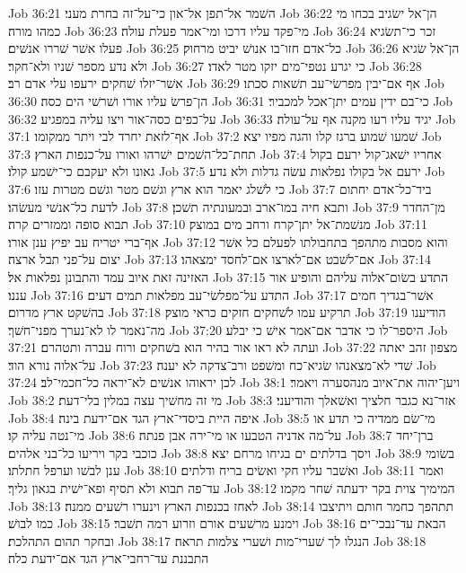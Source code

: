 Job 36:21  השׁמר אל־תפן אל־און כי־על־זה בחרת מעני׃
Job 36:22  הן־אל ישׂגיב בכחו מי כמהו מורה׃
Job 36:23  מי־פקד עליו דרכו ומי־אמר פעלת עולה׃
Job 36:24  זכר כי־תשׂגיא פעלו אשׁר שׁררו אנשׁים׃
Job 36:25  כל־אדם חזו־בו אנושׁ יביט מרחוק׃
Job 36:26  הן־אל שׂגיא ולא נדע מספר שׁניו ולא־חקר׃
Job 36:27  כי יגרע נטפי־מים יזקו מטר לאדו׃
Job 36:28  אשׁר־יזלו שׁחקים ירעפו עלי אדם רב׃
Job 36:29  אף אם־יבין מפרשׂי־עב תשׁאות סכתו׃
Job 36:30  הן־פרשׂ עליו אורו ושׁרשׁי הים כסה׃
Job 36:31  כי־בם ידין עמים יתן־אכל למכביר׃
Job 36:32  על־כפים כסה־אור ויצו עליה במפגיע׃
Job 36:33  יגיד עליו רעו מקנה אף על־עולה׃
Job 37:1  אף־לזאת יחרד לבי ויתר ממקומו׃
Job 37:2  שׁמעו שׁמוע ברגז קלו והגה מפיו יצא׃
Job 37:3  תחת־כל־השׁמים ישׁרהו ואורו על־כנפות הארץ׃
Job 37:4  אחריו ישׁאג־קול ירעם בקול גאונו ולא יעקבם כי־ישׁמע קולו׃
Job 37:5  ירעם אל בקולו נפלאות עשׂה גדלות ולא נדע׃
Job 37:6  כי לשׁלג יאמר הוא ארץ וגשׁם מטר וגשׁם מטרות עזו׃
Job 37:7  ביד־כל־אדם יחתום לדעת כל־אנשׁי מעשׂהו׃
Job 37:8  ותבא חיה במו־ארב ובמעונתיה תשׁכן׃
Job 37:9  מן־החדר תבוא סופה וממזרים קרה׃
Job 37:10  מנשׁמת־אל יתן־קרח ורחב מים במוצק׃
Job 37:11  אף־ברי יטריח עב יפיץ ענן אורו׃
Job 37:12  והוא מסבות מתהפך בתחבולתו לפעלם כל אשׁר יצום על־פני תבל ארצה׃
Job 37:13  אם־לשׁבט אם־לארצו אם־לחסד ימצאהו׃
Job 37:14  האזינה זאת איוב עמד והתבונן נפלאות אל׃
Job 37:15  התדע בשׂום־אלוה עליהם והופיע אור עננו׃
Job 37:16  התדע על־מפלשׂי־עב מפלאות תמים דעים׃
Job 37:17  אשׁר־בגדיך חמים בהשׁקט ארץ מדרום׃
Job 37:18  תרקיע עמו לשׁחקים חזקים כראי מוצק׃
Job 37:19  הודיענו מה־נאמר לו לא־נערך מפני־חשׁך׃
Job 37:20  היספר־לו כי אדבר אם־אמר אישׁ כי יבלע׃
Job 37:21  ועתה לא ראו אור בהיר הוא בשׁחקים ורוח עברה ותטהרם׃
Job 37:22  מצפון זהב יאתה על־אלוה נורא הוד׃
Job 37:23  שׁדי לא־מצאנהו שׂגיא־כח ומשׁפט ורב־צדקה לא יענה׃
Job 37:24  לכן יראוהו אנשׁים לא־יראה כל־חכמי־לב׃
Job 38:1  ויען־יהוה את־איוב מנהסערה ויאמר׃
Job 38:2  מי זה מחשׁיך עצה במלין בלי־דעת׃
Job 38:3  אזר־נא כגבר חלציך ואשׁאלך והודיעני׃
Job 38:4  איפה היית ביסדי־ארץ הגד אם־ידעת בינה׃
Job 38:5  מי־שׂם ממדיה כי תדע או מי־נטה עליה קו׃
Job 38:6  על־מה אדניה הטבעו או מי־ירה אבן פנתה׃
Job 38:7  ברן־יחד כוכבי בקר ויריעו כל־בני אלהים׃
Job 38:8  ויסך בדלתים ים בגיחו מרחם יצא׃
Job 38:9  בשׂומי ענן לבשׁו וערפל חתלתו׃
Job 38:10  ואשׁבר עליו חקי ואשׂים בריח ודלתים׃
Job 38:11  ואמר עד־פה תבוא ולא תסיף ופא־ישׁית בגאון גליך׃
Job 38:12  המימיך צוית בקר ידעתה שׁחר מקמו׃
Job 38:13  לאחז בכנפות הארץ וינערו רשׁעים ממנה׃
Job 38:14  תתהפך כחמר חותם ויתיצבו כמו לבושׁ׃
Job 38:15  וימנע מרשׁעים אורם וזרוע רמה תשׁבר׃
Job 38:16  הבאת עד־נבכי־ים ובחקר תהום התהלכת׃
Job 38:17  הנגלו לך שׁערי־מות ושׁערי צלמות תראה׃
Job 38:18  התבננת עד־רחבי־ארץ הגד אם־ידעת כלה׃
